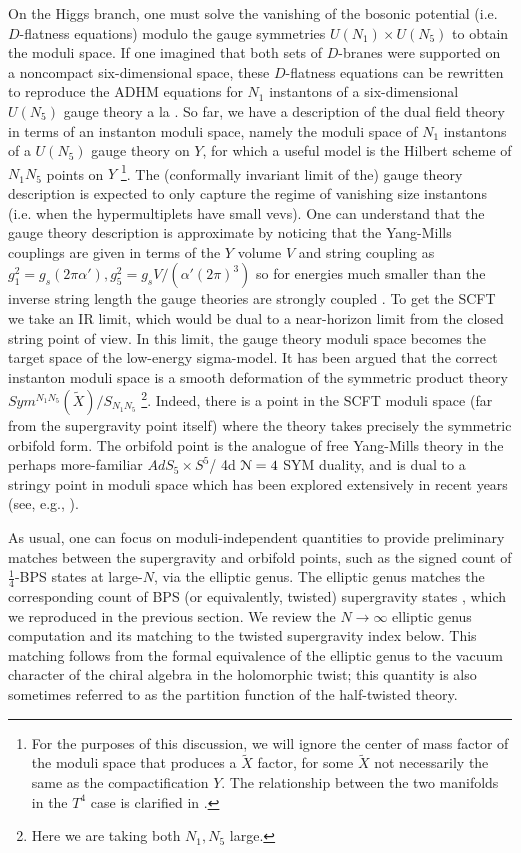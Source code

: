 \documentclass[../main.tex]{subfiles}
\begin{document}
On the Higgs branch, one must solve the vanishing of the bosonic potential (i.e. $D$-flatness equations) modulo the gauge symmetries $U(N_1)\times U(N_5)$ to obtain the moduli space. 
If one imagined that both sets of $D$-branes were supported on a noncompact six-dimensional space, these $D$-flatness equations can be rewritten to reproduce the ADHM equations for $N_1$ instantons of a six-dimensional $U(N_5)$ gauge theory a la \cite{WittenADHM}. So far, we have a description of the dual field theory in terms of an instanton moduli space, namely the moduli space of $N_1$ instantons of a $U(N_5)$ gauge theory on $Y$, for which a useful model is the Hilbert scheme of $N_1 N_5$ points on $Y$ \footnote{For the purposes of this discussion, we will ignore the center of mass factor of the moduli space that produces a $\tilde{X}$ factor, for some $\tilde{X}$ not necessarily the same as the compactification $Y$. The relationship between the two manifolds in the $T^4$ case is clarified in \cite{GiveonKutasovSeiberg}.}. The (conformally invariant limit of the) gauge theory description is expected to only capture the regime of vanishing size instantons (i.e. when the hypermultiplets have small vevs). One can understand that the gauge theory description is approximate by noticing that the Yang-Mills couplings are given in terms of the $Y$ volume $V$ and string coupling as $g_1^2 = g_s (2 \pi \alpha'), g_5^2 = g_s V/(\alpha' (2\pi)^3)$ so for energies much smaller than the inverse string length the gauge theories are strongly coupled \cite{Davidetal}. To get the SCFT we take an IR limit, which would be dual to a near-horizon limit from the closed string point of view. In this limit, the gauge theory moduli space becomes the target space of the low-energy sigma-model. It has been argued that the correct instanton moduli space is a smooth deformation of the symmetric product theory $Sym^{N_1 N_5}(\tilde{X})/S_{N_1 N_5}$ \footnote{Here we are taking both $N_1, N_5$ large.}. Indeed, there is a point in the SCFT moduli space (far from the supergravity point itself) where the theory takes precisely the symmetric orbifold form. The orbifold point is the analogue of free Yang-Mills theory in the perhaps more-familiar $AdS_5\times S^5$/ 4d $\mathcal N =4$ SYM duality, and is dual to a stringy point in moduli space which has been explored extensively in recent years (see, e.g., \cite{Eberhardt:2021vsx, Eberhardt:2019ywk, Eberhardt:2018ouy}).

As usual, one can focus on moduli-independent quantities to provide preliminary matches between the supergravity and orbifold points, such as the signed count of $\frac14$-BPS states at large-$N$, via the elliptic genus. The elliptic genus matches the corresponding count of BPS (or equivalently, twisted) supergravity states \cite{deBoerEG}, which we reproduced in the previous section. We review the $N\to \infty$ elliptic genus computation and its matching to the twisted supergravity index below. This matching follows from the formal equivalence of the elliptic genus to the vacuum character of the chiral algebra in the holomorphic twist; this quantity is also sometimes referred to as the partition function of the half-twisted theory. 
\end{document}
